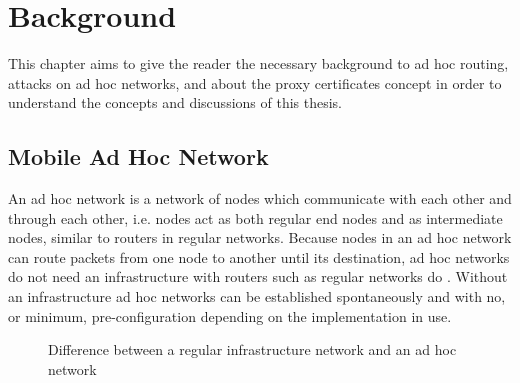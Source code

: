 \chapter{Background}
\label{ch:background}
\acresetall

This chapter aims to give the reader the necessary background to ad hoc routing,
attacks on ad hoc networks, and about the proxy certificates concept in order to
understand the concepts and discussions of this thesis.

\section{Mobile Ad Hoc Network}
An ad hoc network is a network of nodes which communicate with each other and
through each other, i.e. nodes act as both regular end nodes and as intermediate
nodes, similar to routers in regular networks. Because nodes in an ad hoc
network can route packets from one node to another until its destination, ad hoc
networks do not need an infrastructure with routers such as regular networks
do \cite{perkins2008ad}. Without an infrastructure ad hoc networks can be
established spontaneously and with no, or minimum, pre-configuration depending
on the implementation in use.

\begin{figure}[h]
	\centering
	\hspace{15mm}
	\caption{Difference between a regular infrastructure network and an ad hoc network}
	\label{fig:background_networks}
\end{figure}

